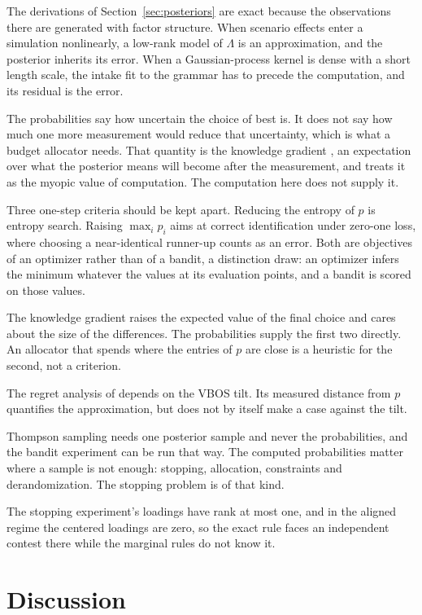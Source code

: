 \documentclass[11pt]{article}
\begin{document}
The derivations of Section~\ref{sec:posteriors} are exact because the
observations there are generated with factor structure. When scenario
effects enter a simulation nonlinearly, a low-rank model of $\Lambda$
is an approximation, and the posterior inherits its error. When a Gaussian-process kernel is dense with a short length scale,
the intake fit to the grammar has to precede the computation, and its
residual is the error.

The probabilities say how uncertain the choice of best is. It does not say
how much one more measurement would reduce that uncertainty, which is
what a budget allocator needs. That quantity is the knowledge
gradient \citep{frazier2008}, an expectation over what the posterior
means will become after the measurement, and \citet{tuisov2026}
treats it as the myopic value of computation. The computation here does not supply it.

Three one-step criteria
should be kept apart. Reducing the entropy of $p$ is entropy search.
Raising $\max_i p_i$ aims at correct identification under zero-one
loss, where choosing a near-identical runner-up counts as an error.
Both are objectives of an optimizer rather than of a bandit, a
distinction \citet{hennig2012} draw: an optimizer infers the minimum
whatever the values at its evaluation points, and a bandit is scored
on those values.

The knowledge gradient raises the expected value of the final choice
and cares about the size of the differences. The probabilities supply the first two directly. An allocator that spends where the entries of $p$
are close is a heuristic for the second, not a criterion.

The regret analysis of \citet{odonoghue2021} depends on the VBOS
tilt. Its measured distance from $p$ quantifies the approximation, but
does not by itself make a case against the tilt.

Thompson sampling needs one posterior sample and never the probabilities, and the bandit experiment can be run that way. The computed probabilities matter where a sample is not enough: stopping, allocation, constraints and
derandomization. The stopping problem is of that kind.

The stopping experiment's loadings have rank at most one, and in the
aligned regime the centered loadings are zero, so the exact rule faces
an independent contest there while the marginal rules do not know
it.

\section{Discussion}
\end{document}
